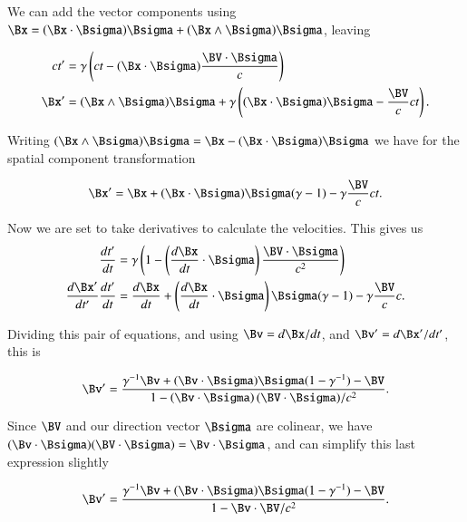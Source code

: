 We can add the vector components using $\Bx = (\Bx \cdot \Bsigma) \Bsigma + (\Bx \wedge \Bsigma) \Bsigma$, leaving

\begin{subequations}
\begin{align}\label{eqn:relativisticElectrodynamicsA1:210}
c t' &= \gamma \left( ct - (\Bx \cdot \Bsigma) \frac{\BV \cdot \Bsigma}{c} \right) \\
\Bx' &= (\Bx \wedge \Bsigma) \Bsigma + \gamma \left( (\Bx \cdot \Bsigma) \Bsigma - \frac{\BV}{c} c t \right) .
\end{align}
\end{subequations}

Writing $(\Bx \wedge \Bsigma) \Bsigma = \Bx - (\Bx \cdot \Bsigma)\Bsigma$ we have for the spatial component transformation

\begin{equation}\label{eqn:relativisticElectrodynamicsA1:220}
\Bx' = \Bx + (\Bx \cdot \Bsigma) \Bsigma (\gamma - 1) - \gamma \frac{\BV}{c} c t.
\end{equation}

Now we are set to take derivatives to calculate the velocities.  This gives us
\begin{subequations}
\begin{align}\label{eqn:relativisticElectrodynamicsA1:230}
\frac{dt'}{dt} &= \gamma \left( 1 - \left( \frac{d\Bx}{dt} \cdot \Bsigma \right) \frac{\BV \cdot \Bsigma}{c^2} \right) \\
\frac{d\Bx'}{dt'} \frac{d t'}{dt} &= \frac{d\Bx}{dt} + \left(\frac{d\Bx}{dt} \cdot \Bsigma\right) \Bsigma (\gamma - 1) - \gamma \frac{\BV}{c} c .
\end{align}
\end{subequations}

Dividing this pair of equations, and using $\Bv = d\Bx/dt$, and $\Bv' = d\Bx'/dt'$, this is

\begin{equation}\label{eqn:relativisticElectrodynamicsA1:240}
\Bv' = \frac{\gamma^{-1} \Bv + (\Bv \cdot \Bsigma) \Bsigma (1 - \gamma^{-1}) - \BV}{ 1 - \left( \Bv \cdot \Bsigma \right) (\BV \cdot \Bsigma)/c^2 }.
\end{equation}

Since $\BV$ and our direction vector $\Bsigma$ are colinear, we have $(\Bv \cdot \Bsigma) (\BV \cdot \Bsigma) = \Bv \cdot \Bsigma$, and can simplify this last expression slightly

\begin{equation}\label{eqn:relativisticElectrodynamicsA1:250}
\Bv' = \frac{\gamma^{-1} \Bv + (\Bv \cdot \Bsigma) \Bsigma (1 - \gamma^{-1}) - \BV}{ 1 - \Bv \cdot \BV/c^2 }.
\end{equation}

